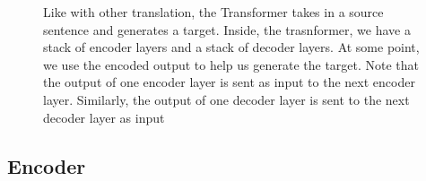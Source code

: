 \documentclass[11pt]{article}
\begin{document}
\begin{figure}[H]
    \centering
    \caption*{Like with other translation, the Transformer takes in a source sentence and generates a target. Inside, the trasnformer, we have a stack of encoder layers and a stack of decoder layers. At some point, we use the encoded output to help us generate the target. Note that the output of one encoder layer is sent as input to the next encoder layer. Similarly, the output of one decoder layer is sent to the next decoder layer as input}
\end{figure}

\subsection{Encoder}
\end{document}
